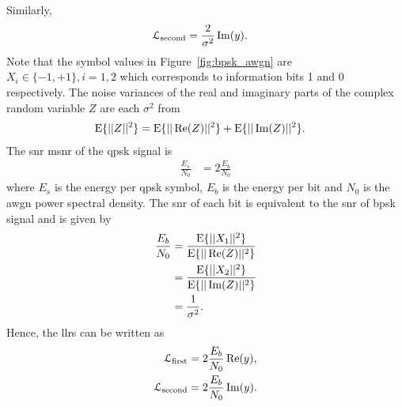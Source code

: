 Similarly,
\begin{align}
\mathcal{L}_{\text{second}}&=\frac{2}{\sigma^2}\operatorname{Im}(y)\label{eq:final_llr2}.
\end{align}
Note that the symbol values in Figure~\ref{fig:bpsk_awgn} are $X_i\in\{-1,+1\},i=1,2$ which corresponds to information bits 1 and 0 respectively. The noise variances of the real and imaginary parts of the complex random variable $Z$ are each $\sigma^2$ from
\begin{align}
\text{E}\{||Z||^2\}&=\text{E}\{||\operatorname{Re}(Z)||^2\}+\text{E}\{||\operatorname{Im}(Z)||^2\}.
\end{align}
The \gls{snr} \gls{msnr} of the \gls{qpsk} signal is
\begin{align}
\frac{E_s}{N_0}&=2\frac{E_b}{N_0}
\end{align}
where $E_s$ is the energy per \gls{qpsk} symbol, $E_b$ is the energy per bit and $N_0$ is the \gls{awgn} power spectral density. The \gls{snr} of each bit is equivalent to the \gls{snr} of \gls{bpsk} signal and is given by
\begin{align}
\frac{E_b}{N_0}&=\frac{\text{E}\{||X_1||^2\}}{\text{E}\{||\operatorname{Re}(Z)||^2\}}\\
&=\frac{\text{E}\{||X_2||^2\}}{\text{E}\{||\operatorname{Im}(Z)||^2\}}\\
&=\frac{1}{\sigma^2}.
\end{align}
Hence, the \glspl{llr} can be written as
\begin{align}
\mathcal{L}_{\text{first}}&=2\frac{E_b}{N_0}\operatorname{Re}(y),\\
\mathcal{L}_{\text{second}}&=2\frac{E_b}{N_0}\operatorname{Im}(y).
\end{align}

